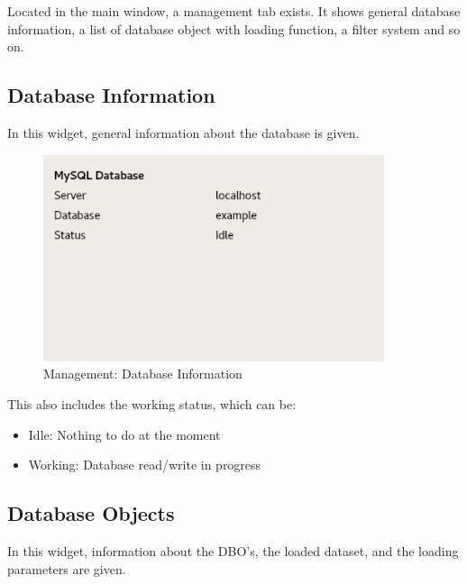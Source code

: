 \documentclass[10pt,letterpaper,extrafontsizes]{memoir}
\begin{document}
Located in the main window, a management tab exists.  It shows general database information, a list of database object with loading function, a filter system and so on.

\subsection{Database Information}

In this widget, general information about the database is given. 

\begin{figure}[H]
  \center
    \includegraphics[width=10cm]{../screenshots/management_database.png}
  \caption{Management: Database Information}
  \label{fig:management_database}
\end{figure}

This also includes the working status, which can be:

\begin{itemize}
 \item Idle: Nothing to do at the moment
 \item Working: Database read/write in progress
\end{itemize}

\subsection{Database Objects}

In this widget, information about the DBO's, the loaded dataset, and the loading parameters are given.
\end{document}
